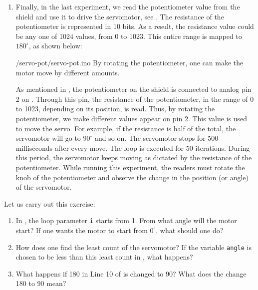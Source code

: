 \begin{enumerate}
  \item Finally, in the last experiment, we read the potentiometer value
        from the shield and use it to drive the servomotor, see
        .  The resistance of the potentiometer is
        represented in 10 bits.  As a result, the resistance value could be
        any one of 1024 values, from 0 to 1023.  This entire range is
        mapped to $180^\circ$, as shown below:
        
        {\LocSERardcode/servo-pot/servo-pot.ino}
        By rotating the potentiometer, one can make
        the motor move by different amounts.
        
        As mentioned in , the potentiometer on the shield is connected 
        to analog pin 2 on \arduino. Through this pin, the resistance of the potentiometer, in the range of 0 to 1023,
        depending on its position, is read.  Thus, by rotating the
        potentiometer, we make different values appear on pin 2.  This value
        is used to move the servo.  For example, if the resistance is half
        of the total, the servomotor will go to $90^\circ$ and so on.  The
        servomotor stops for 500 milliseconds after every move.  The loop is
        executed for 50 iterations. During this period, the servomotor keeps moving as dictated by the
        resistance of the potentiometer. While running this experiment, the readers 
        must rotate the knob of the potentiometer and observe 
        the change in the position (or angle) of the servomotor.   
        
\end{enumerate}

\begin{exercise}
  Let us carry out this exercise:
  \begin{enumerate}
    \item In , the loop parameter {\tt i} starts
          from 1.  From what angle will the motor start?  If one wants the
          motor to start from $0^\circ$, what should one do?
    \item How does one find the least count of the servomotor?  If the
          variable {\tt angle} is chosen to be less than this least count in
          , what happens?
    \item What happens if 180 in Line 10 of  is
          changed to 90?  What does the change 180 to 90 mean?
  \end{enumerate}
\end{exercise}

